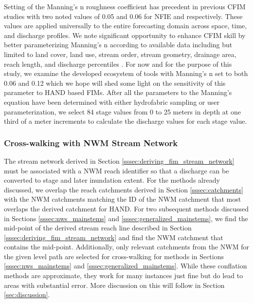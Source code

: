 \documentclass[draft]{dependencies/agujournal2019}
\begin{document}
Setting of the Manning's n roughness coefficient has precedent in previous CFIM studies \cite{maidment2017conceptual,liu2016cybergis,liu2020height,djokic2019arc,garousi2019terrain,zheng2018geoflood} with two noted values of 0.05 and 0.06 for NFIE and  respectively. 
These values are applied universally to the entire forecasting domain across space, time, and discharge profiles.
We note significant opportunity to enhance CFIM skill by better parameterizing Manning's n according to available data including but limited to land cover, land use, stream order, stream geometry, drainage area, reach length, and discharge percentiles \cite{garousi2019terrain,johnson2019integrated}.
For now and for the purpose of this study, we examine the developed ecosystem of tools with Manning's n set to both 0.06 and 0.12 which we hope will shed some light on the sensitivity of this parameter to HAND based FIMs.
After all the parameters to the Manning's equation have been determined with either hydrofabric sampling or user parameterization, we select 84 stage values from 0 to 25 meters in depth at one third of a meter increments to calculate the discharge values for each stage value. 
%
\subsubsection{Cross-walking with NWM Stream Network}
\label{sssec:cross_walking_networks}
%
The stream network derived in Section \ref{sssec:deriving_fim_stream_network} must be associated with a NWM reach identifier so that a discharge can be converted to stage and later inundation extent.
For the methods already discussed, we overlap the reach catchments derived in Section \ref{sssec:catchments} with the NWM catchments matching the ID of the NWM catchment that most overlaps the derived catchment for HAND.
For two subsequent methods discussed in Sections \ref{sssec:nws_mainstems} and \ref{sssec:generalized_mainstems}, we find the mid-point of the derived stream reach line described in Section \ref{sssec:deriving_fim_stream_network} and find the NWM catchment that contains the mid-point.
Additionally, only relevant catchments from the NWM for the given level path are selected for cross-walking for methods in Sections \ref{sssec:nws_mainstems} and \ref{sssec:generalized_mainstems}.
While these conflation methods are approximate, they work for many instances just fine but do lead to areas with substantial error. 
More discussion on this will follow in Section \ref{sec:discussion}.
%
\end{document}

